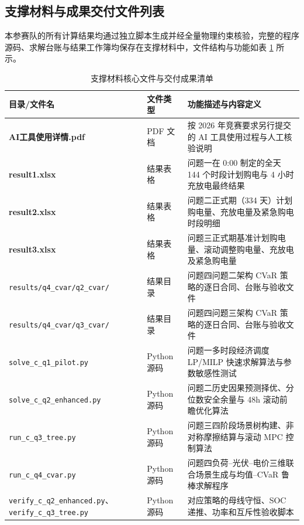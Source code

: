 \documentclass[withoutpreface]{cumcmthesis}
\begin{document}
\clearpage
\begin{appendices}

\section{支撑材料与成果交付文件列表}

本参赛队的所有计算结果均通过独立脚本生成并经全量物理约束核验，完整的程序源码、求解台账与结果工作簿均保存在支撑材料中，文件结构与功能如表 \ref{tab:app_files} 所示。

\begin{table}[htbp]
\centering
\small
\renewcommand{\arraystretch}{1.25}
\caption{支撑材料核心文件与交付成果清单}
\label{tab:app_files}
\begin{tabular*}{\textwidth}{p{} p{} p{}}
\toprule[1.5pt]
目录/文件名 & 文件类型 & 功能描述与内容定义 \\
\midrule[1pt]
\textbf{AI工具使用详情.pdf} & PDF 文档 & 按 2026 年竞赛要求另行提交的 AI 工具使用过程与人工核验说明 \\
\textbf{result1.xlsx}       & 结果表格 & 问题一在 0:00 制定的全天 144 个时段计划购电与 4 小时充放电最终结果 \\
\textbf{result2.xlsx}       & 结果表格 & 问题二正式期（334 天）计划购电量、充放电量及紧急购电时段明细 \\
\textbf{result3.xlsx}       & 结果表格 & 问题三正式期基准计划购电量、滚动调整购电量、充放电及紧急购电量 \\
\texttt{results/q4\_cvar/q2\_cvar/} & 结果目录 & 问题四问题二架构 CVaR 策略的逐日合同、台账与验收文件 \\
\texttt{results/q4\_cvar/q3\_cvar/} & 结果目录 & 问题四问题三架构 CVaR 策略的逐日合同、台账与验收文件 \\
\midrule[0.5pt]
\texttt{solve\_c\_q1\_pilot.py}    & Python 源码 & 问题一多时段经济调度 LP/MILP 快速求解算法与参数敏感性测试 \\
\texttt{solve\_c\_q2\_enhanced.py} & Python 源码 & 问题二历史因果预测择优、分位数安全余量与 48h 滚动前瞻优化算法 \\
\texttt{run\_c\_q3\_tree.py}       & Python 源码 & 问题三四阶段场景树构建、非对称摩擦结算与滚动 MPC 控制算法 \\
\texttt{run\_c\_q4\_cvar.py}       & Python 源码 & 问题四负荷--光伏--电价三维联合场景生成与均值--CVaR 鲁棒求解程序 \\
\texttt{verify\_c\_q2\_enhanced.py}、\texttt{verify\_c\_q3\_tree.py} & Python 源码 & 对应策略的母线守恒、SOC 递推、功率和互斥性验收脚本 \\
\bottomrule[1.5pt]
\end{tabular*}
\end{table}
\normalsize


\end{appendices}
\end{document}
